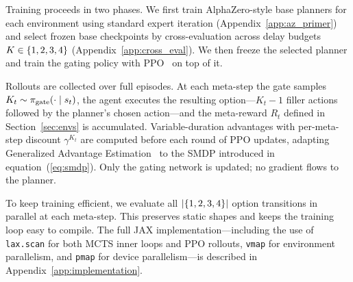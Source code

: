 Training proceeds in two phases.
We first train AlphaZero-style base planners for each environment using
standard expert iteration (Appendix~\ref{app:az_primer}) and select
frozen base checkpoints by cross-evaluation across delay budgets
$K \in \{1,2,3,4\}$ (Appendix~\ref{app:cross_eval}).
We then freeze the selected planner and train the gating policy with
PPO~\citep{schulman2017proximal} on top of it.

Rollouts are collected over full episodes. At each meta-step the gate
samples $K_t \sim \pi_{\mathrm{gate}}(\cdot \mid s_t)$,
the agent executes the resulting option---$K_t{-}1$ filler actions
followed by the planner's chosen action---and the meta-reward $R_t$
defined in Section~\ref{sec:envs} is accumulated.
Variable-duration advantages with per-meta-step discount $\gamma^{K_t}$
are computed before each round of PPO updates, adapting Generalized
Advantage Estimation~\citep{schulman2015high} to the SMDP introduced in
equation~(\ref{eq:smdp}).
Only the gating network is updated; no gradient flows to the planner.

To keep training efficient, we evaluate all $|\{1,2,3,4\}|$ option
transitions in parallel at each meta-step.
This preserves static shapes and keeps the training loop easy to
compile.
The full JAX implementation---including the use of \texttt{lax.scan}
for both MCTS inner loops and PPO rollouts, \texttt{vmap} for
environment parallelism, and \texttt{pmap} for device parallelism---is
described in Appendix~\ref{app:implementation}.
